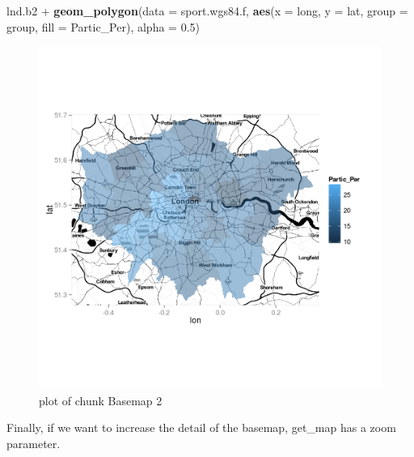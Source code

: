 \documentclass[]{article}
\makeatletter
\newenvironment{Shaded}{}{}
\newcommand{\KeywordTok}[1]{\textcolor[rgb]{0.00,0.44,0.13}{\textbf{{#1}}}}
\newcommand{\DataTypeTok}[1]{\textcolor[rgb]{0.56,0.13,0.00}{{#1}}}
\newcommand{\FloatTok}[1]{\textcolor[rgb]{0.25,0.63,0.44}{{#1}}}
\newcommand{\NormalTok}[1]{{#1}}
\def\maxwidth{\ifdim\Gin@nat@width>\linewidth\linewidth
\else\Gin@nat@width\fi}
\let\Oldincludegraphics\includegraphics
\renewcommand{\includegraphics}[1]{\Oldincludegraphics[width=\maxwidth]{#1}}
\makeatother
\begin{document}
\begin{Shaded}
\begin{Highlighting}[]
\NormalTok{lnd.b2 + }\KeywordTok{geom_polygon}\NormalTok{(}\DataTypeTok{data =} \NormalTok{sport.wgs84.f, }\KeywordTok{aes}\NormalTok{(}\DataTypeTok{x =} \NormalTok{long, }\DataTypeTok{y =} \NormalTok{lat, }\DataTypeTok{group =} \NormalTok{group, }
    \DataTypeTok{fill =} \NormalTok{Partic_Per), }\DataTypeTok{alpha =} \FloatTok{0.5}\NormalTok{)}
\end{Highlighting}
\end{Shaded}
\begin{figure}[htbp]
\centering
\includegraphics{figure/Basemap_2.png}
\caption{plot of chunk Basemap 2}
\end{figure}

Finally, if we want to increase the detail of the basemap, get\_map has
a zoom parameter.
\end{document}
